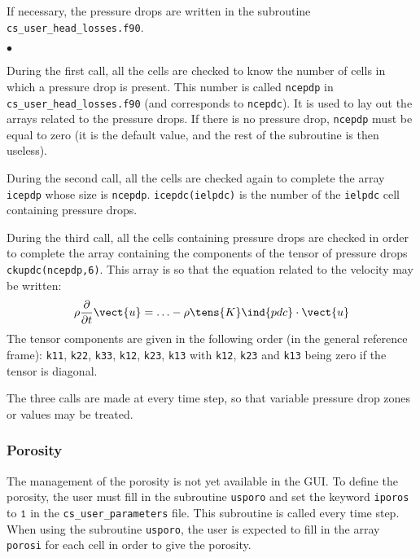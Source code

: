 {{{If necessary, the pressure drops are written in the
subroutine \texttt{cs\_user\_head\_losses.f90}.

\begin{list}{$\bullet$}{}
\item During the first call, all the cells are checked to know the
      number of cells in which a pressure drop is present.
      This number is called \texttt{ncepdp} in
      \texttt{cs\_user\_head\_losses.f90} (and corresponds to
      \texttt{ncepdc}). It is used to lay out the arrays
      related to the pressure drops. If there is no pressure drop,
      \texttt{ncepdp} must be equal to zero (it is the default value, and the
      rest of the subroutine is then useless).

\item During the second call, all the cells are checked again to
      complete the array \texttt{icepdp} whose size is
      \texttt{ncepdp}. \mbox{\texttt{icepdc(ielpdc)}} is the number of the
      \texttt{ielpdc}\raisebox{1ex}{\small th} cell containing pressure drops.

\item During the third call, all the cells containing pressure drops
      are checked in order to complete the array
      containing the components of the tensor of pressure drops
      \mbox{\texttt{ckupdc(ncepdp,6)}}. This array is so that
      the equation related to the velocity may be written:
\begin{displaymath}
\rho\frac{\partial}{\partial t}\vect{u}=\ldots -\rho\tens{K}\ind{pdc}\cdot\vect{u}
\end{displaymath}
The tensor components are given in the following order (in the general
      reference frame): \texttt{k11}, \texttt{k22}, \texttt{k33}, \texttt{k12},
      \texttt{k23}, \texttt{k13} with \texttt{k12}, \texttt{k23} and \texttt{k13}
      being zero if the tensor is diagonal.

\end{list}


The three calls are made at every time step, so that variable pressure drop
zones or values may be treated.

\subsubsection{Porosity}

The management of the porosity is not yet available in the GUI. To define the porosity, the user
must fill in the subroutine \texttt{usporo} and set the keyword \texttt{iporos} to $\texttt{1}$ in the
\texttt{cs\_user\_parameters} file. This subroutine is called every time step.\\
When using the subroutine \texttt{usporo}, the user is expected to fill in the array \texttt{porosi}
for each cell in order to give the porosity.

}}}
